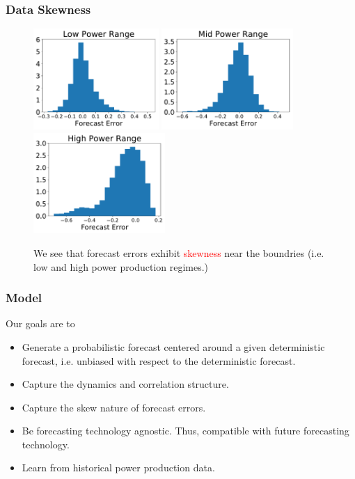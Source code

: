 \documentclass[aspectratio=169]{beamer}\usepackage[utf8]{inputenc}
\begin{document}
\begin{frame}\frametitle{Data Skewness}
\begin{figure}
  \includegraphics[width=47.5mm,scale=1]{plots/hist_low.pdf}
  \includegraphics[width=50mm,scale=1]{plots/hist_mid.pdf}
  \includegraphics[width=50mm,scale=1]{plots/hist_high.pdf}
  \caption{We see that forecast errors exhibit \textcolor{red}{skewness} near the boundries (i.e. low and high power production regimes.)}
\end{figure}
\end{frame}

\begin{frame}\frametitle{Model}
Our goals are to
\begin{itemize}
  \item Generate a probabilistic forecast centered around a given deterministic forecast, i.e. unbiased with respect to the deterministic forecast.
  \item Capture the dynamics and correlation structure.
  \item Capture the skew nature of forecast errors.
  \item Be forecasting technology agnostic. Thus, compatible with future forecasting technology.
  \item Learn from historical power production data.
\end{itemize}
\end{frame}
\end{document}
